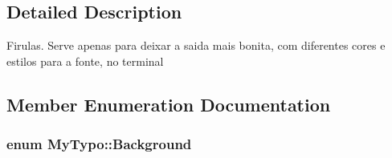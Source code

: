 \subsection{Detailed Description}
Firulas. Serve apenas para deixar a saida mais bonita, com diferentes cores e estilos para a fonte, no terminal 

\subsection{Member Enumeration Documentation}
\hypertarget{classMyTypo_ac6643b465e94f6ecb7fb650c4b3531e8}{
\subsubsection[{Background}]{\setlength{\rightskip}{0pt plus 5cm}enum {\bf MyTypo::Background}}}
\label{classMyTypo_ac6643b465e94f6ecb7fb650c4b3531e8}
